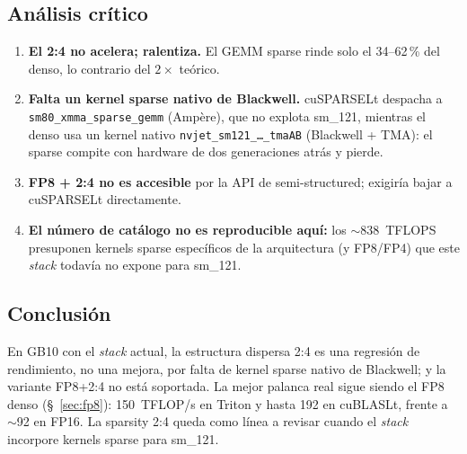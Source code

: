 \subsection{Análisis crítico}

\begin{enumerate}
  \item \textbf{El 2:4 no acelera; ralentiza.} El GEMM sparse rinde solo el 34--62\,\% del
  denso, lo contrario del $2\times$ teórico.
  \item \textbf{Falta un kernel sparse nativo de Blackwell.} cuSPARSELt despacha a
  \texttt{sm80\_xmma\_sparse\_gemm} (Ampère), que no explota sm\_121, mientras el denso usa
  un kernel nativo \texttt{nvjet\_sm121\_\dots\_tmaAB} (Blackwell + TMA): el sparse compite
  con hardware de dos generaciones atrás y pierde.
  \item \textbf{FP8 + 2:4 no es accesible} por la API de semi-structured; exigiría bajar a
  cuSPARSELt directamente.
  \item \textbf{El número de catálogo no es reproducible aquí:} los $\sim$838~TFLOPS
  presuponen kernels sparse específicos de la arquitectura (y FP8/FP4) que este \emph{stack}
  todavía no expone para sm\_121.
\end{enumerate}

\subsection{Conclusión}

En GB10 con el \emph{stack} actual, la estructura dispersa 2:4 es una regresión de
rendimiento, no una mejora, por falta de kernel sparse nativo de Blackwell; y la variante
FP8+2:4 no está soportada. La mejor palanca real sigue siendo el FP8 denso
(§~\ref{sec:fp8}): 150~TFLOP/s en Triton y hasta 192 en cuBLASLt, frente a $\sim$92 en FP16.
La sparsity 2:4 queda como línea a revisar cuando el \emph{stack} incorpore kernels sparse
para sm\_121.
